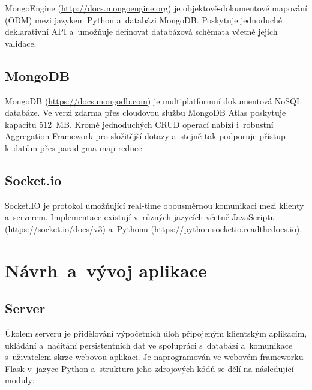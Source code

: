 \documentclass[a4paper,12pt]{article}
\begin{document}
{{{{{{{{MongoEngine (\url{http://docs.mongoengine.org}) je objektově-dokumentové mapování (ODM) mezi jazykem Python a~databázi MongoDB. Poskytuje jednoduché deklarativní API a~umožňuje definovat databázová schémata včetně jejich validace.
\clearpage



\vspace{-10pt}

\subsection{MongoDB}

MongoDB (\url{https://docs.mongodb.com}) je multiplatformní dokumentová NoSQL databáze. Ve verzi zdarma přes cloudovou službu MongoDB Atlas poskytuje kapacitu 512~MB. Kromě jednoduchých CRUD operací nabízí i~robustní Aggregation Framework pro složitější dotazy a~stejně tak podporuje přístup k~datům přes paradigma map-reduce.



\vspace{-10pt}

\subsection{Socket.io}

Socket.IO je protokol umožňující real-time obousměrnou komunikaci mezi klienty a~serverem. Implementace existují v~různých jazycích včetně JavaScriptu (\url{https://socket.io/docs/v3}) a~Pythonu (\url{https://python-socketio.readthedocs.io}).




\section{Návrh~a~vývoj aplikace}


\subsection{Server}

Úkolem serveru je přidělování výpočetních úloh připojeným klientským aplikacím, ukládání a~načítání persistentních dat ve spolupráci s~databází a~komunikace s~uživatelem skrze webovou aplikaci. Je naprogramován ve webovém frameworku Flask v~jazyce Python a~struktura jeho zdrojových kódů se dělí na následující moduly:

}}}}}}}}
\end{document}
